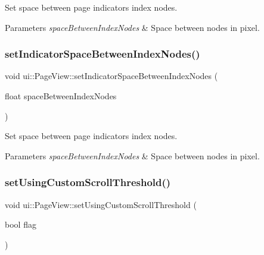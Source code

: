 Set space between page indicator\textquotesingle{}s index nodes. 


\begin{DoxyParams}{Parameters}
{\em space\+Between\+Index\+Nodes} & Space between nodes in pixel. \\
\hline
\end{DoxyParams}
\mbox{\label{classui_1_1PageView_ac181b03f26045ac2b0be91ed177d03db}} 
\subsubsection{\texorpdfstring{set\+Indicator\+Space\+Between\+Index\+Nodes()}{setIndicatorSpaceBetweenIndexNodes()}\hspace{0.1cm}{\footnotesize\ttfamily [2/2]}}
{\footnotesize\ttfamily void ui\+::\+Page\+View\+::set\+Indicator\+Space\+Between\+Index\+Nodes (\begin{DoxyParamCaption}\item[{float}]{space\+Between\+Index\+Nodes }\end{DoxyParamCaption})}



Set space between page indicator\textquotesingle{}s index nodes. 


\begin{DoxyParams}{Parameters}
{\em space\+Between\+Index\+Nodes} & Space between nodes in pixel. \\
\hline
\end{DoxyParams}
\mbox{\label{classui_1_1PageView_a1e01540660aa7c0c79ae736929f4784b}} 
\subsubsection{\texorpdfstring{set\+Using\+Custom\+Scroll\+Threshold()}{setUsingCustomScrollThreshold()}\hspace{0.1cm}{\footnotesize\ttfamily [1/2]}}
{\footnotesize\ttfamily void ui\+::\+Page\+View\+::set\+Using\+Custom\+Scroll\+Threshold (\begin{DoxyParamCaption}\item[{bool}]{flag }\end{DoxyParamCaption})}



